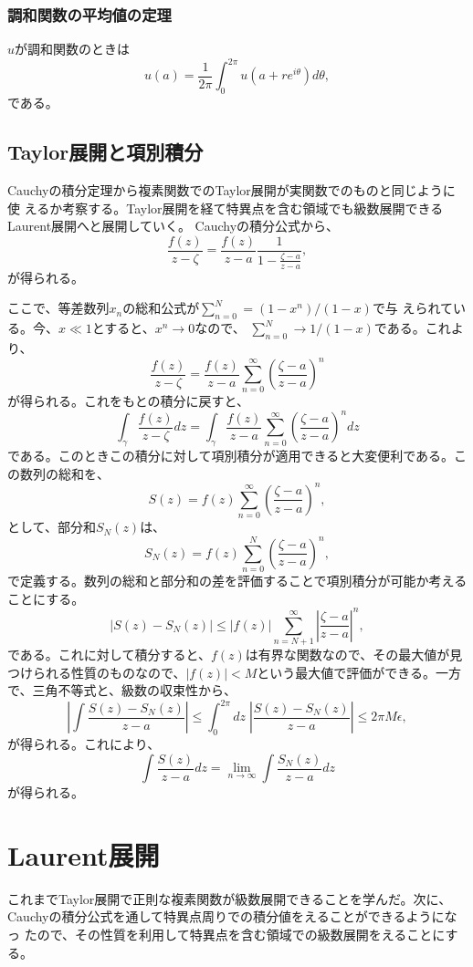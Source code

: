 \subsubsection{調和関数の平均値の定理}
$u$が調和関数のときは
\begin{equation}
 u (a) =\frac{1}{2\pi}\int_{0}^{2\pi}u(a+re^{i\theta})d\theta,
\end{equation}
である。

\subsection{Taylor展開と項別積分}
Cauchyの積分定理から複素関数でのTaylor展開が実関数でのものと同じように使
えるか考察する。Taylor展開を経て特異点を含む領域でも級数展開できる
Laurent展開へと展開していく。
Cauchyの積分公式から、
\[
 \frac{f(z)}{z - \zeta}  
 = \frac{f(z)}{z - a}\frac{1}{1-\frac{\zeta - a}{z - a}}, 
\]
が得られる。

ここで、等差数列$x_n$の総和公式が$\sum_{n=0}^N = (1 - x^n)/(1 - x)$で与
えられている。今、$x \ll 1$とすると、$x^n \to 0$なので、
$\sum_{n=0}^N \to 1/(1-x)$である。これより、
\[
  \frac{f(z)}{z - \zeta}  
 = \frac{f(z)}{z - a}\sum_{n=0}^{\infty}
 \left(\frac{\zeta - a}{z - a}\right)^n
\]
が得られる。これをもとの積分に戻すと、
\[
   \int_{\gamma}\frac{f(z)}{z - \zeta}  dz
 = \int_{\gamma}\frac{f(z)}{z - a}\sum_{n=0}^{\infty}
 \left(\frac{\zeta - a}{z - a}\right)^n dz
\]
である。このときこの積分に対して項別積分が適用できると大変便利である。こ
の数列の総和を、
\[
 S (z) = f (z) \sum_{n=0}^{\infty} 
 \left(\frac{\zeta - a}{z - a}\right)^n,
\]
として、部分和$S_N(z)$は、
\[
 S_N (z) = f (z) \sum_{n=0}^N
 \left(\frac{\zeta - a}{z - a}\right)^n,
\]
で定義する。数列の総和と部分和の差を評価することで項別積分が可能か考える
ことにする。
\[
 \left|S(z) - S_N (z)\right| 
 \leq \left|f(z)\right|\sum_{n=N+1}^{\infty}
 \left|\frac{\zeta - a}{z - a}\right|^n,
\]
である。これに対して積分すると、$f(z)$は有界な関数なので、その最大値が見
つけられる性質のものなので、$|f(z)| < M$という最大値で評価ができる。一方
で、三角不等式と、級数の収束性から、
\[
 \left|\int \frac{S(z) - S_N (z)}{z - a}\right|
 \leq \int_{0}^{2\pi}dz\mspace{5mu}
 \left|\frac{S (z) - S_N (z)}{z - a}\right|
 \leq 2\pi M \epsilon,
\]
が得られる。これにより、
\[
 \int \frac{S(z)}{z - a}dz
 = \lim_{n\to \infty}
 \int \frac{S_N(z)}{z - a}dz
\]
が得られる。

\section{Laurent展開}
これまでTaylor展開で正則な複素関数が級数展開できることを学んだ。次に、
Cauchyの積分公式を通して特異点周りでの積分値をえることができるようになっ
たので、その性質を利用して特異点を含む領域での級数展開をえることにする。


